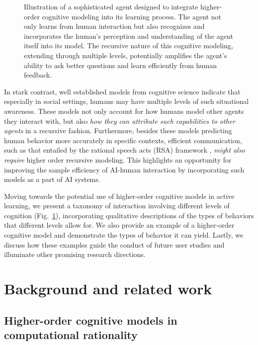 \documentclass[letterpaper]{article} %
\begin{document}
\begin{figure}[t!]
\vspace{0.2cm}
	\centering
	\def\svgwidth{1\linewidth}
	{
 \fontsize{9}{9}
		}
	\caption{Illustration of a sophisticated agent designed to integrate higher-order cognitive modeling into its learning process. The agent not only learns from human interaction but also recognizes and incorporates the human's perception and understanding of the agent itself into its model. The recursive nature of this cognitive modeling, extending through multiple levels, potentially amplifies the agent's ability to ask better questions and learn efficiently from human feedback.}
	\label{fig:fig1}
\end{figure}

In stark contrast, well established models from cognitive science \cite{Stahl1995level-k, goodman2016rsa} indicate that especially in social settings, humans may have multiple levels of such situational awareness. These models not only account for how humans model other agents they interact with, but also \textit{how they can attribute such capabilities to other agents} in a recursive fashion. Furthermore, besides these models predicting human behavior more accurately in specific contexts, efficient communication, such as that entailed by the rational speech acts (RSA) framework \cite{goodman2016rsa}, \textit{might also require} higher order recursive modeling. This highlights an opportunity for improving the sample efficiency of AI-human interaction by incorporating such models as a part of AI systems. 

Moving towards the potential use of higher-order cognitive models in active learning, we present a taxonomy of interaction involving different levels of cognition (Fig.~\ref{fig:fig1}), incorporating qualitative descriptions of the types of behaviors that different levels allow for. We also provide an example of a higher-order cognitive model and demonstrate the types of behavior it can yield. Lastly, we discuss how these examples guide the conduct of future user studies and illuminate other promising research directions.



\section{Background and related work}



\subsection{Higher-order cognitive models in computational rationality}
\end{document}
